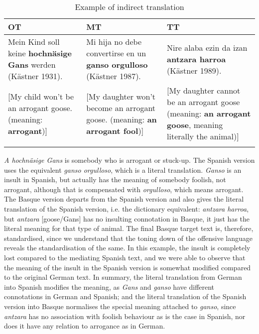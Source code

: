 \documentclass[output=paper]{LSP/langsci}
\begin{document}
\begin{table}
     \centering
     \begin{tabularx}{\textwidth}{XXX}
     \lsptoprule
OT 			& MT     & TT  \\ 
\midrule
Mein Kind soll keine \textbf{hochnäsige Gans} werden (Kästner 1931).   & Mi hija no debe convertirse en un \textbf{ganso orgulloso} (Kästner 1987).   & Nire alaba ezin da izan \textbf{antzara harroa} (Kästner 1989). \\ 
{[}My child won't be an arrogant goose. (meaning: \textbf{arrogant}){]} & {[}My daughter won't become an arrogant goose. (meaning: \textbf{an arrogant fool}){]}  & {[}My daughter cannot be an arrogant goose (meaning: \textbf{an arrogant goose}, meaning literally the animal){]}  \\

\lspbottomrule
\end{tabularx}

 \caption{Example of indirect translation}
     \label{3.3}
\end{table}


\textit{A hochnäsige Gans} is somebody who is arrogant or stuck-up. The Spanish version uses the equivalent \textit{ganso orgulloso}, which is a literal translation. \textit{Ganso} is an insult in Spanish, but actually has the meaning of somebody foolish, not arrogant, although that is compensated with \textit{orgulloso}, which means arrogant. The Basque version departs from the Spanish version and also gives the literal translation of the Spanish version, i.e. the dictionary equivalent: \textit{antzara harroa}, but \textit{antzara} [goose/Gans] has no insulting connotation in Basque, it just has the literal meaning for that type of animal. The final Basque target text is, therefore, standardised, since we understand that the toning down of the offensive language reveals the standardisation of the same. In this example, the insult is completely lost compared to the mediating Spanish text, and we were able to observe that the meaning of the insult in the Spanish version is somewhat modified compared to the original German text. In summary, the literal translation from German into Spanish modifies the meaning, as \textit{Gans} and \textit{ganso} have different connotations in German and Spanish; and the literal translation of the Spanish version into Basque normalises the special meaning attached to \textit{ganso}, since \textit{antzara} has no association with foolish behaviour as is the case in Spanish, nor does it have any relation to arrogance as in German.
\end{document}
